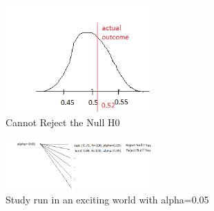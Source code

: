 \begin{itemize}
\begin{figure}[ht]
  \begin{center}
    \includegraphics[width=0.5\textwidth]{figures/fig8.png}
    \caption{
    Cannot Reject the Null H0
      }
    \label{fig:fig7}
  \end{center}
\end{figure}

\begin{figure}[ht]
  \begin{center}
    \includegraphics[width=0.5\textwidth]{figures/fig9.png}
    \caption{
    Study run in an exciting world with alpha=0.05 
      }
    \label{fig:fig9}
  \end{center}
\end{figure}

\end{itemize}





